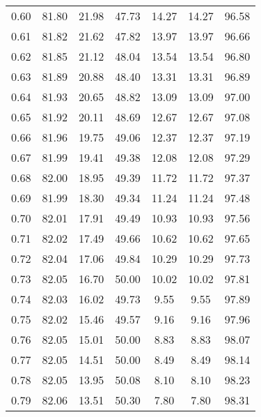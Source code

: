 \begin{tabular}{|c|c|c|c|c|c|c|}
      0.60 &     81.80 &     21.98 &      47.73 &   14.27 &      14.27 &         96.58 \\
      0.61 &     81.82 &     21.62 &      47.82 &   13.97 &      13.97 &         96.66 \\
      0.62 &     81.85 &     21.12 &      48.04 &   13.54 &      13.54 &         96.80 \\
      0.63 &     81.89 &     20.88 &      48.40 &   13.31 &      13.31 &         96.89 \\
      0.64 &     81.93 &     20.65 &      48.82 &   13.09 &      13.09 &         97.00 \\
      0.65 &     81.92 &     20.11 &      48.69 &   12.67 &      12.67 &         97.08 \\
      0.66 &     81.96 &     19.75 &      49.06 &   12.37 &      12.37 &         97.19 \\
      0.67 &     81.99 &     19.41 &      49.38 &   12.08 &      12.08 &         97.29 \\
      0.68 &     82.00 &     18.95 &      49.39 &   11.72 &      11.72 &         97.37 \\
      0.69 &     81.99 &     18.30 &      49.34 &   11.24 &      11.24 &         97.48 \\
      0.70 &     82.01 &     17.91 &      49.49 &   10.93 &      10.93 &         97.56 \\
      0.71 &     82.02 &     17.49 &      49.66 &   10.62 &      10.62 &         97.65 \\
      0.72 &     82.04 &     17.06 &      49.84 &   10.29 &      10.29 &         97.73 \\
      0.73 &     82.05 &     16.70 &      50.00 &   10.02 &      10.02 &         97.81 \\
      0.74 &     82.03 &     16.02 &      49.73 &    9.55 &       9.55 &         97.89 \\
      0.75 &     82.02 &     15.46 &      49.57 &    9.16 &       9.16 &         97.96 \\
      0.76 &     82.05 &     15.01 &      50.00 &    8.83 &       8.83 &         98.07 \\
      0.77 &     82.05 &     14.51 &      50.00 &    8.49 &       8.49 &         98.14 \\
      0.78 &     82.05 &     13.95 &      50.08 &    8.10 &       8.10 &         98.23 \\
      0.79 &     82.06 &     13.51 &      50.30 &    7.80 &       7.80 &         98.31 \\

\end{tabular}
